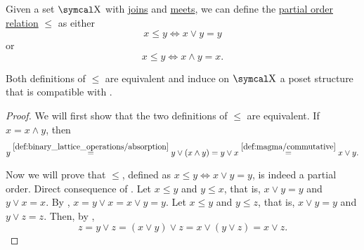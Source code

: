 \begin{proposition}\label{thm:binary_lattice_operations_poset}
  Given a set \( \CX \) with \hyperref[def:binary_lattice_operations/join]{joins} and \hyperref[def:binary_lattice_operations/meet]{meets}, we can define the \hyperref[def:poset]{partial order relation} \( \leq \) as either
  \begin{equation*}
    x \leq y \iff x \vee y = y
  \end{equation*}
  or
  \begin{equation*}
    x \leq y \iff x \wedge y = x.
  \end{equation*}

  Both definitions of \( \leq \) are equivalent and induce on \( \CX \) a poset structure that is compatible with .
\end{proposition}
\begin{proof}
  We will first show that the two definitions of \( \leq \) are equivalent. If \( x = x \wedge y \), then
  \begin{equation*}
    y
    \overset {\ref{def:binary_lattice_operations/absorption}} =
    y \vee (x \wedge y)
    =
    y \vee x
    \overset {\ref{def:magma/commutative}} =
    x \vee y.
  \end{equation*}

  Now we will prove that \( \leq \), defined as \( x \leq y \iff x \vee y = y \), is indeed a partial order.
   Direct consequence of .
   Let \( x \leq y \) and \( y \leq x \), that is, \( x \vee y = y \) and \( y \vee x = x \). By , \( x = y \vee x = x \vee y = y \).
   Let \( x \leq y \) and \( y \leq z \), that is, \( x \vee y = y \) and \( y \vee z = z \). Then, by ,
  \begin{equation*}
    z = y \vee z = (x \vee y) \vee z = x \vee (y \vee z) = x \vee z.
  \end{equation*}
\end{proof}

